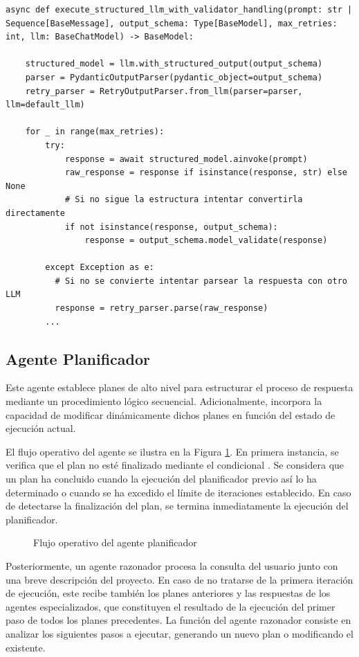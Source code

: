 \begin{lstlisting}[caption={Validación de la salida estructurada de un LLM},label={lst:structured_output}]
  async def execute_structured_llm_with_validator_handling(prompt: str | Sequence[BaseMessage], output_schema: Type[BaseModel], max_retries: int, llm: BaseChatModel) -> BaseModel:

    structured_model = llm.with_structured_output(output_schema)
    parser = PydanticOutputParser(pydantic_object=output_schema)
    retry_parser = RetryOutputParser.from_llm(parser=parser, llm=default_llm)

    for _ in range(max_retries):
        try:
            response = await structured_model.ainvoke(prompt)
            raw_response = response if isinstance(response, str) else None
            # Si no sigue la estructura intentar convertirla directamente 
            if not isinstance(response, output_schema):
                response = output_schema.model_validate(response)

        except Exception as e:
          # Si no se convierte intentar parsear la respuesta con otro LLM  
          response = retry_parser.parse(raw_response)
        ...
\end{lstlisting}
\subsection{Agente Planificador}
\label{sec:agente_planificador}
Este agente establece planes de alto nivel para estructurar el proceso de respuesta mediante un procedimiento lógico secuencial. Adicionalmente, incorpora la capacidad de modificar dinámicamente dichos planes en función del estado de ejecución actual.

El flujo operativo del agente se ilustra en la Figura \ref{fig:planner}. En primera instancia, se verifica que el plan no esté finalizado mediante el condicional . Se considera que un plan ha concluido cuando la ejecución del planificador previo así lo ha determinado o cuando se ha excedido el límite de iteraciones establecido. En caso de detectarse la finalización del plan, se termina inmediatamente la ejecución del planificador.

\begin{figure}[h]
\centering
{}
\caption{Flujo operativo del agente planificador}
\label{fig:planner}
\end{figure}
Posteriormente, un agente razonador procesa la consulta del usuario junto con una breve descripción del proyecto. En caso de no tratarse de la primera iteración de ejecución, este recibe también los planes anteriores y las respuestas de los agentes especializados, que constituyen el resultado de la ejecución del primer paso de todos los planes precedentes. La función del agente razonador consiste en analizar los siguientes pasos a ejecutar, generando un nuevo plan o modificando el existente.

